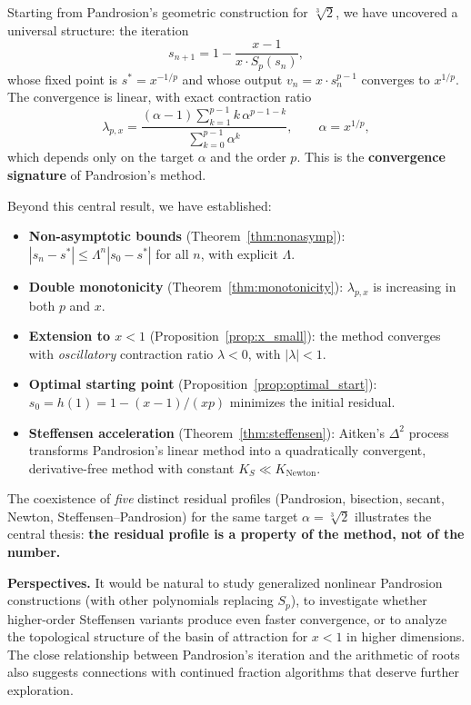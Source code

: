 \documentclass[11pt,a4paper]{article}
\theoremstyle{definition}
\newcommand{\cbrt}[1]{\sqrt[3]{#1}}
\begin{document}
Starting from Pandrosion's geometric construction for $\cbrt{2}$, we have uncovered a universal structure: the iteration
\[
  s_{n+1} = 1 - \frac{x-1}{x \cdot S_p(s_n)},
\]
whose fixed point is $s^* = x^{-1/p}$ and whose output $v_n = x \cdot s_n^{p-1}$ converges to $x^{1/p}$. The convergence is linear, with exact contraction ratio
\[
  \lambda_{p,x} = \frac{(\alpha-1)\displaystyle\sum_{k=1}^{p-1} k\,\alpha^{p-1-k}}{\displaystyle\sum_{k=0}^{p-1}\alpha^k}, \qquad \alpha = x^{1/p},
\]
which depends only on the target $\alpha$ and the order $p$. This is the \textbf{convergence signature} of Pandrosion's method.

\medskip

Beyond this central result, we have established:
\begin{itemize}
  \item \textbf{Non-asymptotic bounds} (Theorem~\ref{thm:nonasymp}): $|s_n - s^*| \leq \Lambda^n |s_0 - s^*|$ for all $n$, with explicit $\Lambda$.
  \item \textbf{Double monotonicity} (Theorem~\ref{thm:monotonicity}): $\lambda_{p,x}$ is increasing in both $p$ and $x$.
  \item \textbf{Extension to $x < 1$} (Proposition~\ref{prop:x_small}): the method converges with \emph{oscillatory} contraction ratio $\lambda < 0$, with $|\lambda| < 1$.
  \item \textbf{Optimal starting point} (Proposition~\ref{prop:optimal_start}): $s_0 = h(1) = 1 - (x-1)/(xp)$ minimizes the initial residual.
  \item \textbf{Steffensen acceleration} (Theorem~\ref{thm:steffensen}): Aitken's $\Delta^2$ process transforms Pandrosion's linear method into a quadratically convergent, derivative-free method with constant $K_S \ll K_{\text{Newton}}$.
\end{itemize}

\medskip

The coexistence of \emph{five} distinct residual profiles (Pandrosion, bisection, secant, Newton, Steffensen--Pandrosion) for the same target $\alpha = \cbrt{2}$ illustrates the central thesis: \textbf{the residual profile is a property of the method, not of the number.}

\medskip

\textbf{Perspectives.} It would be natural to study generalized nonlinear Pandrosion constructions (with other polynomials replacing $S_p$), to investigate whether higher-order Steffensen variants produce even faster convergence, or to analyze the topological structure of the basin of attraction for $x < 1$ in higher dimensions. The close relationship between Pandrosion's iteration and the arithmetic of roots also suggests connections with continued fraction algorithms that deserve further exploration.
\end{document}
